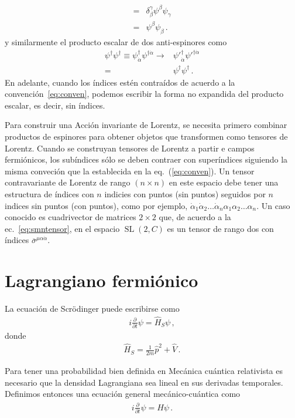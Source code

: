 \begin{frame}
\begin{align}
  =& \delta_{\beta}^{\gamma}\psi^{\beta}\psi_\gamma \nonumber\\
  =& \psi^{\beta}\psi_\beta\,.
\end{align}
y similarmente el producto escalar de dos anti-espinores como
\begin{align}
  \psi^{\dagger}\psi^{\dagger}\equiv {\psi}^{\dagger}_{\dot{\alpha}}{\psi}^{\dagger\dot{\alpha}}
\to &{\psi'}^{\dagger}_{\dot{\alpha}}{\psi'}^{\dagger\dot{\alpha}}\nonumber\\
=&\psi^{\dagger}\psi^{\dagger}\,.
\end{align}
En adelante, cuando los índices estén contraídos de acuerdo a la convención~\eqref{eq:conven}, podemos escribir la forma no expandida del producto escalar, es decir, sin índices.
\end{frame}
Para construir una Acción invariante de Lorentz, se necesita primero
combinar productos de espinores para obtener objetos que transformen
como tensores de Lorentz. Cuando se construyan tensores de Lorentz a
partir e campos fermiónicos, los subíndices sólo se deben contraer con
superíndices siguiendo la misma conveción que la establecida en la
eq.~(\ref{eq:conven}). Un tensor contravariante de Lorentz de
rango $(n\times n)$ en este espacio debe tener una estructura de
índices con $n$ indicies con puntos (sin puntos) seguidos por $n$
indices sin puntos (con puntos), como por ejemplo,
$\dot{\alpha}_1\dot{\alpha}_2\ldots\dot{\alpha}_n\alpha_1\alpha_2\ldots\alpha_n$. Un 
caso conocido es cuadrivector de matrices $2\times2$ que, de acuerdo
a la ec.~\eqref{eq:smntensor}, en el espacio
$\operatorname{SL}(2,C)$ es un tensor de rango dos con índices
$\overline{\sigma}^{\mu \alpha\dot{\alpha}}$.


\section{Lagrangiano fermiónico}
\label{sec:dirac-equation}
La ecuación de Scrödinger puede escribirse como
\begin{align}
    i\frac{\partial}{\partial t}\psi=\hat{H}_{S} \psi\,,  
\end{align}
donde
\begin{align}
  \hat{H}_{S}=\frac{1}{2m}\hat p^2+\widehat V\,.
\end{align}


Para tener una probabilidad bien definida en Mecánica cuántica relativista es necesario que la densidad Lagrangiana sea lineal en sus derivadas temporales.
Definimos entonces una ecuación general mecánico-cuántica como
\begin{align}
  i\frac{\partial}{\partial t}\psi=\hat{H} \psi\,.
\end{align}

